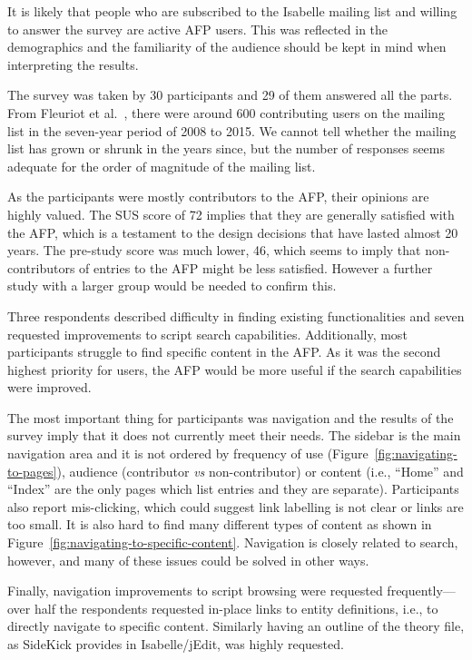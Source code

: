 \documentclass[bsc,frontabs,oneside,singlespacing,parskip,deptreport,logo]{infthesis}
\begin{document}
It is likely that people who are subscribed to the Isabelle mailing list and willing to answer the survey are active AFP users. This was reflected in the demographics and the familiarity of the audience should be kept in mind when interpreting the results.

The survey was taken by 30 participants and 29 of them answered all the parts. From Fleuriot et al.\ \cite{fleuriot2016social}, there were around 600 contributing users on the mailing list in the seven-year period of 2008 to 2015. We cannot tell whether the mailing list has grown or shrunk in the years since, but the number of responses seems adequate for the order of magnitude of the mailing list.

As the participants were mostly contributors to the AFP, their opinions are highly valued. The SUS score of 72 implies that they are generally satisfied with the AFP, which is a testament to the design decisions that have lasted almost 20 years. The pre-study score was much lower, 46, which seems to imply that non-contributors of entries to the AFP might be less satisfied. However a further study with a larger group would be needed to confirm this.

Three respondents described difficulty in finding existing functionalities and seven requested improvements to script search capabilities. Additionally, most participants struggle to find specific content in the AFP\@. As it was the second highest priority for users, the AFP would be more useful if the search capabilities were improved.

The most important thing for participants was navigation and the results of the survey imply that it does not currently meet their needs. The sidebar is the main navigation area and it is not ordered by frequency of use (Figure~\ref{fig:navigating-to-pages}), audience (contributor \emph{vs} non-contributor) or content (i.e., ``Home'' and ``Index'' are the only pages which list entries and they are separate). Participants also report mis-clicking, which could suggest link labelling is not clear or links are too small. It is also hard to find many different types of content as shown in Figure~\ref{fig:navigating-to-specific-content}. Navigation is closely related to search, however, and many of these issues could be solved in other ways.

Finally, navigation improvements to script browsing were requested frequently---over half the respondents requested in-place links to entity definitions, i.e., to directly navigate to specific content. Similarly having an outline of the theory file, as SideKick provides in Isabelle/jEdit, was highly requested.
\end{document}
